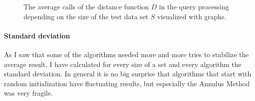 \documentclass[runningheads,a4paper]{llncs}
\begin{document}
\begin{figure}
	\begin{center}
	\end{center}
	\caption{The average calls of the distance function $D$ in the query processing depending on the size of the test
		data set $S$ visualized with graphs.}
	\label{fig:queryprocessing:graph}
\end{figure}

\paragraph{Standard deviation}

As I saw that some of the algorithms needed more and more tries to stabilize the average result, I have calculated for
every size of a set and every algorithm the standard deviation. In general it is no big surprise that algorithms that
start with random initialization have fluctuating results, but especially the Annulus Method was very fragile.
\end{document}

